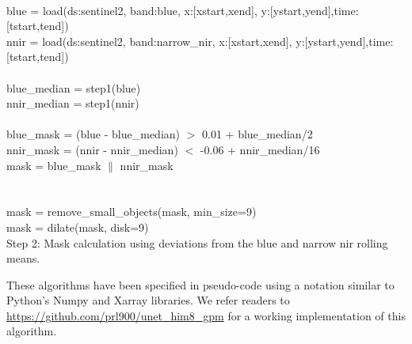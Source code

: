 \documentclass[essd, manuscript]{copernicus}
\begin{document}
\begin{algorithm}[H]
\SetAlgoLined
 \\
 blue = load(ds:sentinel2, band:blue, x:[xstart,xend], y:[ystart,yend],time:[tstart,tend])\\
 nnir = load(ds:sentinel2, band:narrow\_nir, x:[xstart,xend], y:[ystart,yend],time:[tstart,tend])\\
 
 \\
 blue\_median = step1(blue)\\
 nnir\_median = step1(nnir)\\
 
 \\
 blue\_mask = (blue - blue\_median) $>$ 0.01 + blue\_median/2\\
 nnir\_mask = (nnir - nnir\_median) $<$ -0.06 + nnir\_median/16\\
 mask = blue\_mask $\parallel$ nnir\_mask\\
 \\
 \\
 mask = remove\_small\_objects(mask, min\_size=9)\\
 mask = dilate(mask, disk=9)\\
 \caption{Step 2: Mask calculation using deviations from the blue and narrow nir rolling means.}
\end{algorithm}

These algorithms have been specified in pseudo-code using a notation similar to Python's Numpy and Xarray libraries. We refer readers to \href{https://github.com/prl900/unet_him8_gpm}{https://github.com/prl900/unet\_him8\_gpm} for a working implementation of this algorithm.



\noappendix       %

\end{document}
